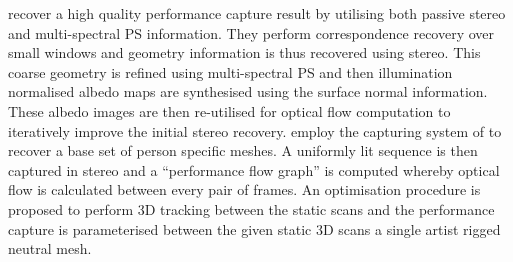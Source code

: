 recover a high quality performance capture result by utilising both
passive stereo and multi-spectral PS information. They perform
correspondence recovery over small windows and geometry information is thus
recovered using stereo. This coarse geometry is refined using multi-spectral PS
and then illumination normalised albedo maps are synthesised using the surface
normal information. These albedo images are then re-utilised for optical flow
computation to iteratively improve the initial stereo recovery.
\citet{Fyffe:2014hc} employ the capturing system of \citet{ghosh2011multiview}
to recover a base set of person specific meshes. A uniformly lit
sequence is then captured in stereo and a ``performance flow graph'' is
computed whereby optical flow is calculated between every pair of frames.
An optimisation procedure is proposed to perform 3D tracking between the
static scans and the performance capture is parameterised between the given
static 3D scans a single artist rigged neutral mesh.
